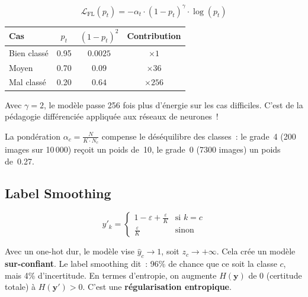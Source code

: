 \documentclass[11pt,a4paper]{article}
\begin{document}
\begin{equation}
  \boxed{\mathcal{L}_{\text{FL}}(p_t) = -\alpha_t \cdot (1 - p_t)^\gamma \cdot \log(p_t)}
\end{equation}

\begin{intubox}
\begin{center}
\begin{tabular}{lccc}
\toprule
\textbf{Cas} & $p_t$ & $(1-p_t)^2$ & \textbf{Contribution} \\
\midrule
Bien class\'e & 0.95 & $0.0025$ & $\times 1$ \\
Moyen & 0.70 & $0.09$ & $\times 36$ \\
Mal class\'e & 0.20 & $0.64$ & $\times 256$ \\
\bottomrule
\end{tabular}
\end{center}
Avec $\gamma=2$, le mod\`ele passe 256 fois plus d'\og{}\'energie\fg{} sur les cas difficiles. C'est de la p\'edagogie diff\'erenci\'ee appliqu\'ee aux r\'eseaux de neurones~!

La pond\'eration $\alpha_c = \frac{N}{K \cdot N_c}$ compense le d\'es\'equilibre des classes~: le grade~4 (200 images sur 10\,000) re\c{c}oit un poids de~10, le grade~0 (7300 images) un poids de~0.27.
\end{intubox}

\subsection{Label Smoothing}

\begin{equation}
  y'_k = \begin{cases}
    1 - \varepsilon + \frac{\varepsilon}{K} & \text{si } k = c \\[4pt]
    \frac{\varepsilon}{K} & \text{sinon}
  \end{cases}
\end{equation}

\begin{intubox}
Avec un one-hot dur, le mod\`ele vise $\hat{y}_c \to 1$, soit $z_c \to +\infty$. Cela cr\'ee un mod\`ele \textbf{sur-confiant}. Le label smoothing dit~: \og{}96\% de chance que ce soit la classe $c$, mais 4\% d'incertitude\fg{}. En termes d'entropie, on augmente $H(\mathbf{y})$ de 0 (certitude totale) \`a $H(\mathbf{y}') > 0$. C'est une \textbf{r\'egularisation entropique}.
\end{intubox}
\end{document}
